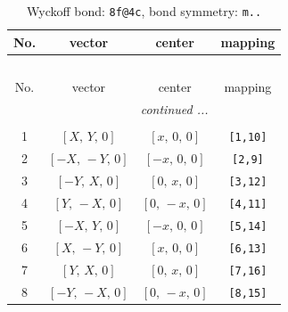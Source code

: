 \documentclass[fleqn,8pt]{jsarticle}
\begin{document}
\begin{longtable}{cccc}
\caption{Wyckoff bond: {\tt 8f@4c}, bond symmetry: {\tt m..}}
 \\
 \hline \hline
No. & vector & center & mapping \\ \hline \endfirsthead

\multicolumn{3}{l}{\tablename\ \thetable{}} \\
 \hline \hline
No. & vector & center & mapping \\ \hline \endhead

 \hline \hline
\multicolumn{3}{r}{\footnotesize\it continued ...} \\ \endfoot

 \hline \hline
\multicolumn{3}{r}{} \\ \endlastfoot

1 & $\left[ X,\, Y,\, 0 \right]$ & $\left[ x,\, 0,\, 0 \right]$ & {\tt [1,10]} \\ \hline
2 & $\left[ - X,\, - Y,\, 0 \right]$ & $\left[ - x,\, 0,\, 0 \right]$ & {\tt [2,9]} \\ \hline
3 & $\left[ - Y,\, X,\, 0 \right]$ & $\left[ 0,\, x,\, 0 \right]$ & {\tt [3,12]} \\ \hline
4 & $\left[ Y,\, - X,\, 0 \right]$ & $\left[ 0,\, - x,\, 0 \right]$ & {\tt [4,11]} \\ \hline
5 & $\left[ - X,\, Y,\, 0 \right]$ & $\left[ - x,\, 0,\, 0 \right]$ & {\tt [5,14]} \\ \hline
6 & $\left[ X,\, - Y,\, 0 \right]$ & $\left[ x,\, 0,\, 0 \right]$ & {\tt [6,13]} \\ \hline
7 & $\left[ Y,\, X,\, 0 \right]$ & $\left[ 0,\, x,\, 0 \right]$ & {\tt [7,16]} \\ \hline
8 & $\left[ - Y,\, - X,\, 0 \right]$ & $\left[ 0,\, - x,\, 0 \right]$ & {\tt [8,15]} \\
\end{longtable}
\renewcommand{\arraystretch}{1.2}
\end{document}
